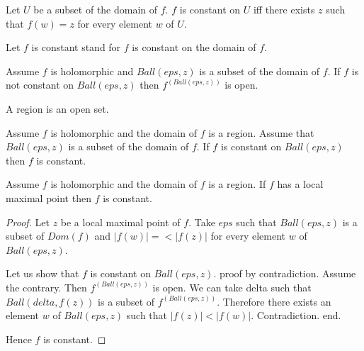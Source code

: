\documentclass{article}
\begin{document}
\begin{forthel}
    \begin{definition}
      Let $U$ be a subset of the domain of $f$. $f$ is constant on $U$ iff there exists $z$ such that $f(w) = z$ for every element $w$ of $U$.
    \end{definition}

    Let $f$ is constant stand for $f$ is constant on the domain of $f$.

    \begin{axiom}
      Assume $f$ is holomorphic and $Ball(eps,z)$ is a subset of the domain of $f$. If $f$ is not constant on $Ball(eps,z)$ then $f^(Ball(eps,z))$ is open.
    \end{axiom}

    \begin{signature}
      A region is an open set.
    \end{signature}

    \begin{axiom}[IdentityTheorem]
      Assume $f$ is holomorphic and the domain of $f$ is a region. Assume that $Ball(eps,z)$ is a subset of the domain of $f$. If $f$ is constant on $Ball(eps,z)$ then $f$ is constant.
    \end{axiom}

    \begin{proposition}[Maximumprinciple]
      Assume $f$ is holomorphic and the domain of $f$ is a region. If $f$ has a local maximal point then $f$ is constant.
    \end{proposition}
    \begin{proof}
      Let $z$ be a local maximal point of $f$. Take $eps$ such that $Ball(eps,z)$ is a subset of $Dom(f)$ and $|f(w)| =< |f(z)|$ for every element $w$ of $Ball(eps,z)$.

      Let us show that $f$ is constant on $Ball(eps,z)$.
      proof by contradiction.
        Assume the contrary. Then $f^(Ball(eps,z))$ is open. We can take delta such that $Ball(delta, f(z))$ is a subset of $f^(Ball(eps,z))$. Therefore there exists an element $w$ of $Ball(eps,z)$ such that $|f(z)| < |f(w)|$. Contradiction.
    	end.

      Hence $f$ is constant.
    \end{proof}
  \end{forthel}
\end{document}
